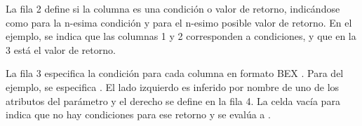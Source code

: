 La fila 2 define si la columna es una condición o valor de retorno, indicándose como   para la n-esima condición y  para el n-esimo posible valor de retorno.
En el ejemplo, se indica que las columnas 1 y 2 corresponden a condiciones, y que en la 3 está el valor de retorno.

La fila 3 especifica la condición para cada columna en formato BEX \cite{openl-bex}.
Para  del ejemplo, se especifica .
El lado izquierdo es inferido por nombre de uno de los atributos del parámetro  y el derecho se define en la fila 4.
La celda vacía para  indica que no hay condiciones para ese retorno y se evalúa a .






